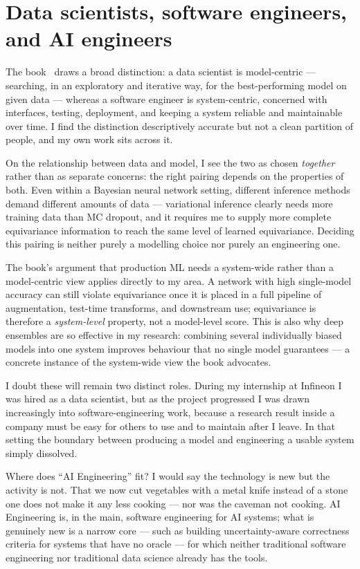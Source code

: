 \documentclass[11pt, a4paper]{article}
\begin{document}
\section{Data scientists, software engineers, and AI engineers}

The book~\cite{CoverMachineLearning} draws a broad distinction: a data scientist is model-centric — searching, in an exploratory and iterative way, for the best-performing model on given data — whereas a software engineer is system-centric, concerned with interfaces, testing, deployment, and keeping a system reliable and maintainable over time. I find the distinction descriptively accurate but not a clean partition of people, and my own work sits across it.

On the relationship between data and model, I see the two as chosen \emph{together} rather than as separate concerns: the right pairing depends on the properties of both. Even within a Bayesian neural network setting, different inference methods demand different amounts of data — variational inference clearly needs more training data than MC dropout, and it requires me to supply more complete equivariance information to reach the same level of learned equivariance. Deciding this pairing is neither purely a modelling choice nor purely an engineering one.

The book's argument that production ML needs a system-wide rather than a model-centric view applies directly to my area. A network with high single-model accuracy can still violate equivariance once it is placed in a full pipeline of augmentation, test-time transforms, and downstream use; equivariance is therefore a \emph{system-level} property, not a model-level score. This is also why deep ensembles are so effective in my research: combining several individually biased models into one system improves behaviour that no single model guarantees — a concrete instance of the system-wide view the book advocates.

I doubt these will remain two distinct roles. During my internship at Infineon I was hired as a data scientist, but as the project progressed I was drawn increasingly into software-engineering work, because a research result inside a company must be easy for others to use and to maintain after I leave. In that setting the boundary between producing a model and engineering a usable system simply dissolved.

Where does ``AI Engineering'' fit? I would say the technology is new but the activity is not. That we now cut vegetables with a metal knife instead of a stone one does not make it any less cooking — nor was the caveman not cooking. AI Engineering is, in the main, software engineering for AI systems; what is genuinely new is a narrow core — such as building uncertainty-aware correctness criteria for systems that have no oracle — for which neither traditional software engineering nor traditional data science already has the tools.
\end{document}
